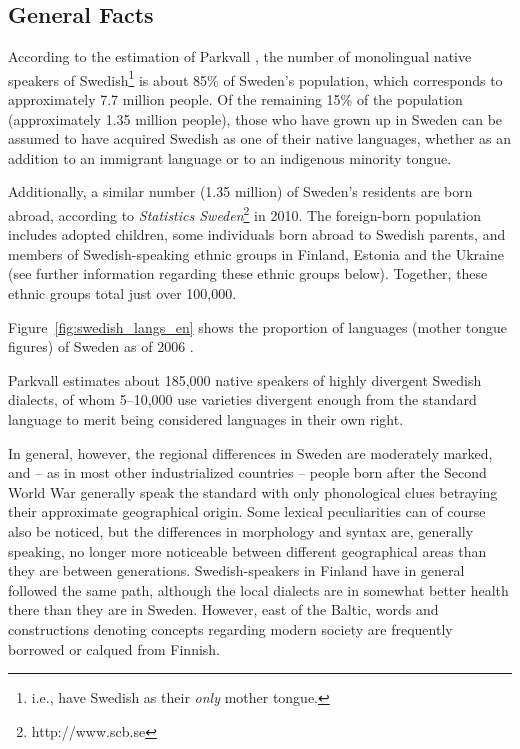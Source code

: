 \begin{multicols}{2}

\subsection{General Facts}

According to the estimation of Parkvall \cite{parkvall2009}, the
number of monolingual native speakers of Swedish\footnote{i.e., have
  Swedish as their \emph{only} mother tongue.} is about 85\% of Sweden’s
population, which corresponds to approximately 7.7 million people. Of
the remaining 15\% of the population (approximately 1.35 million
people), those who have grown up in Sweden can be assumed to have
acquired Swedish as one of their native languages, whether as an
addition to an immigrant language or to an indigenous minority tongue.


Additionally, a similar number (1.35 million) of Sweden's residents
are born abroad, according to \textit{Statistics
  Sweden}\footnote{http://www.scb.se} in 2010. The foreign-born
population includes adopted children, some individuals born abroad to
Swedish parents, and members of Swedish-speaking ethnic groups in
Finland, Estonia and the Ukraine (see further information regarding
these ethnic groups below). Together, these ethnic groups total just
over 100,000.

Figure~\ref{fig:swedish_langs_en} shows the proportion of languages (mother tongue figures) of Sweden as of 2006 \cite{parkvall2009}.

Parkvall \cite{parkvall2009} estimates about 185,000 native speakers
of highly divergent Swedish dialects, of whom 5--10,000 use varieties
divergent enough from the standard language to merit being considered
languages in their own right.

In general, however, the regional differences in Sweden are moderately
marked, and -- as in most other industrialized countries -- people born
after the Second World War generally speak the standard with only
phonological clues betraying their approximate geographical
origin. Some lexical peculiarities can of course also be noticed, but
the differences in morphology and syntax are, generally speaking, no
longer more noticeable between different geographical areas than they
are between generations. Swedish-speakers in Finland have in general
followed the same path, although the local dialects are in somewhat
better health there than they are in Sweden. However, east of the
Baltic, words and constructions denoting concepts regarding modern
society are frequently borrowed or calqued from Finnish.


\end{multicols}
